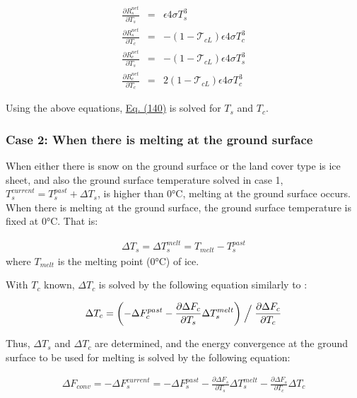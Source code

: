 \begin{eqnarray}
 \frac{\partial R^{net}_s}{\partial T_s} &=&
 \epsilon 4 \sigma T_s^3 \\
 \frac{\partial R^{net}_s}{\partial T_c} &=&
 - ( 1 - {\mathcal{T}}_{cL} ) \epsilon 4 \sigma T_c^3 \\
 \frac{\partial R^{net}_c}{\partial T_s} &=&
 - ( 1 - {\mathcal{T}}_{cL} ) \epsilon 4 \sigma T_s^3 \\
 \frac{\partial R^{net}_c}{\partial T_c} &=&
  2( 1 - {\mathcal{T}}_{cL} ) \epsilon 4 \sigma T_c^3
\end{eqnarray}

Using the above equations, \href{$eq140}{Eq. (140)} is solved for \(T_s\) and \(T_c\).

\subsubsection{Case 2: When there is melting at the ground surface}\label{case-2-when-there-is-melting-at-the-ground-surface}

When either there is snow on the ground surface or the land cover type is ice sheet, and also the ground surface temperature solved in case 1, \(T_s^{current} = T_s^{past}+\Delta T_s\), is higher than
0°C, melting at the ground surface occurs. When there is melting at the ground surface, the ground surface temperature is fixed at 0°C. That is:

\begin{eqnarray}
 \Delta T_s = \Delta T_s^{melt} = T_{melt} - T_s^{past}
\end{eqnarray} where \(T_{melt}\) is the melting point (0°C) of ice.

With \(T_c\) known, \(\Delta T_c\) is solved by the following equation similarly to \hyperref[eq140]{}:

\begin{eqnarray}
 \Delta T_c = \left( - \Delta F_c^{past}
            - \frac{\partial \Delta F_c}{\partial T_s} \Delta T_s^{melt}
              \right) \Bigm/ \frac{\partial \Delta F_c}{\partial T_c}
\end{eqnarray}

Thus, \(\Delta T_s\) and \(\Delta T_c\) are determined, and the energy convergence at the ground surface to be used for melting is solved by the following equation:

\begin{eqnarray}
 \Delta F_{conv} =
 - \Delta F_s^{current} = - \Delta F_s^{past}
 - \frac{\partial \Delta F_s}{\partial T_s} \Delta T_s^{melt}
 - \frac{\partial \Delta F_s}{\partial T_c} \Delta T_c
\end{eqnarray}

